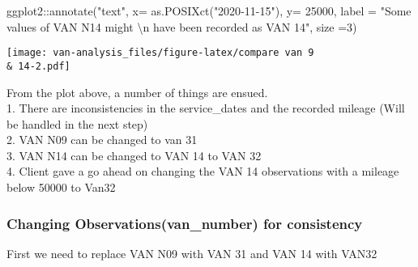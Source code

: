 \documentclass[
]{article}
\newenvironment{Shaded}{\begin{snugshade}}{\end{snugshade}}
\newcommand{\AttributeTok}[1]{\textcolor[rgb]{0.77,0.63,0.00}{#1}}
\newcommand{\DecValTok}[1]{\textcolor[rgb]{0.00,0.00,0.81}{#1}}
\newcommand{\FunctionTok}[1]{\textcolor[rgb]{0.00,0.00,0.00}{#1}}
\newcommand{\NormalTok}[1]{#1}
\newcommand{\SpecialCharTok}[1]{\textcolor[rgb]{0.00,0.00,0.00}{#1}}
\newcommand{\StringTok}[1]{\textcolor[rgb]{0.31,0.60,0.02}{#1}}
\begin{document}
\begin{Shaded}
\begin{Highlighting}[]
\NormalTok{  ggplot2}\SpecialCharTok{::}\FunctionTok{annotate}\NormalTok{(}\StringTok{"text"}\NormalTok{, }\AttributeTok{x=} \FunctionTok{as.POSIXct}\NormalTok{(}\StringTok{"2020{-}11{-}15"}\NormalTok{), }\AttributeTok{y=} \DecValTok{25000}\NormalTok{, }\AttributeTok{label =} \StringTok{"Some values of VAN N14 might }\SpecialCharTok{\textbackslash{}n}\StringTok{ have been recorded as VAN 14"}\NormalTok{, }\AttributeTok{size =}\DecValTok{3}\NormalTok{)}
\end{Highlighting}
\end{Shaded}

\texttt{[image: van-analysis\_files/figure-latex/compare van 9 \\\& 14-2.pdf]}

From the plot above, a number of things are ensued.\\
1. There are inconsistencies in the service\_dates and the recorded
mileage (Will be handled in the next step)\\
2. VAN N09 can be changed to van 31\\
3. VAN N14 can be changed to VAN 14 to VAN 32\\
4. Client gave a go ahead on changing the VAN 14 observations with a
mileage below 50000 to Van32

\hypertarget{changing-observationsvan_number-for-consistency}{%
\subsubsection{Changing Observations(van\_number) for
consistency}\label{changing-observationsvan_number-for-consistency}}

First we need to replace VAN N09 with VAN 31 and VAN 14 with VAN32
\end{document}
